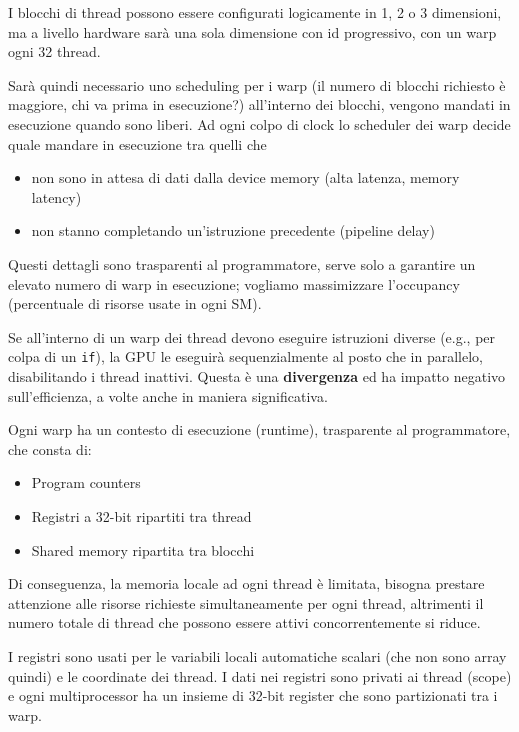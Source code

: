 I blocchi di thread possono essere configurati logicamente in 1, 2 o 3 dimensioni, ma a livello hardware sarà una sola dimensione con id progressivo, con un warp ogni 32 thread.

Sarà quindi necessario uno scheduling per i warp (il numero di blocchi richiesto è maggiore, chi va prima in esecuzione?) all'interno dei blocchi, vengono mandati in esecuzione quando sono liberi. Ad ogni colpo di clock lo scheduler dei warp decide quale mandare in esecuzione tra quelli che
\begin{itemize}
	\item non sono in attesa di dati dalla device memory (alta latenza, memory latency)
	
	\item non stanno completando un'istruzione precedente (pipeline delay)
\end{itemize}

Questi dettagli sono trasparenti al programmatore, serve solo a garantire un elevato numero di warp in esecuzione; vogliamo massimizzare l'occupancy (percentuale di risorse usate in ogni SM).

Se all'interno di un warp dei thread devono eseguire istruzioni diverse (e.g., per colpa di un \texttt{if}), la GPU le eseguirà sequenzialmente al posto che in parallelo, disabilitando i thread inattivi. Questa è una \textbf{divergenza} ed ha impatto negativo sull'efficienza, a volte anche in maniera significativa. 

Ogni warp ha un contesto di esecuzione (runtime), trasparente al programmatore, che consta di: 
\begin{itemize}
	\item Program counters
	
	\item Registri a 32-bit ripartiti tra thread
	
	\item Shared memory ripartita tra blocchi
\end{itemize} 

Di conseguenza, la memoria locale ad ogni thread è limitata, bisogna prestare attenzione alle risorse richieste simultaneamente per ogni thread, altrimenti il numero totale di thread che possono essere attivi concorrentemente si riduce.

I registri sono usati per le variabili locali automatiche scalari (che non sono array quindi) e le coordinate dei thread. I dati nei registri sono privati ai thread (scope) e ogni multiprocessor ha un insieme di 32-bit register che sono partizionati tra i warp.


